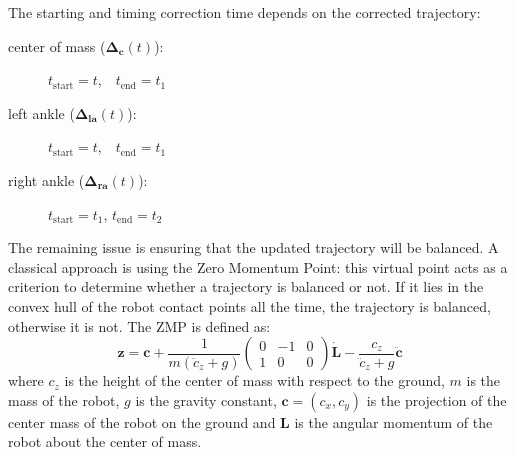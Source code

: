 The starting and timing correction time depends on the corrected trajectory:
\begin{description}
\item[center of mass ($\mathbf{\Delta_c}(t)$):]\hspace{3cm}
  $t_{\text{start}} = t$,~~$t_{\text{end}} = t_1$
\item[left ankle ($\mathbf{\Delta_{\text{la}}}(t)$):]\hspace{3cm}
  $t_{\text{start}} = t$,~~$t_{\text{end}} = t_1$
\item[right ankle ($\mathbf{\Delta_{\text{ra}}}(t)$):]\hspace{3cm}
  $t_{\text{start}} = t_1$, $t_{\text{end}} = t_2$
\end{description}


The remaining issue is ensuring that the updated trajectory will be
balanced. A classical approach is using the Zero Momentum Point: this
virtual point acts as a criterion to determine whether a trajectory is
balanced or not. If it lies in the convex hull of the robot contact
points all the time, the trajectory is balanced, otherwise it is
not. The ZMP is defined as:
%
\begin{equation} \label{eq:zmp1}
  \mathbf{z} = \mathbf{c} + \frac{1}{m(\ddot{c}_z +
    g)}\left(\begin{array}{ccc} 0 &-1 &0\\1 &0 &0\end{array}\right)
    \mathbf{\dot{\textbf{L}}} - \frac{c_z}{\ddot{c}_z + g}
    \ddot{\mathbf{c}}
\end{equation}
%
where $c_z$ is the height of the center of mass with respect to the
ground, $m$ is the mass of the robot, $g$ is the gravity constant,
\mbox{$\mathbf{c}=(c_x,c_y)$} is the projection of the center mass of
the robot on the ground and $\textbf{L}$ is the angular momentum of
the robot about the center of mass.


